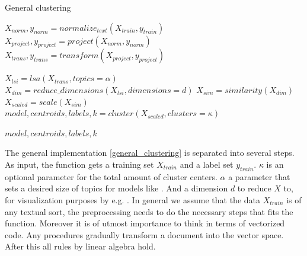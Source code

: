   \begin{algorithm}[H]
  \begin{algorithmic}[1]
    \caption{General clustering}\label{general_clustering}
      \State $X_{norm},y_{norm} = normalize_{text}(X_{train},y_{train})$
      \State $X_{project},y_{project} = project(X_{norm},y_{norm})$
      \State $X_{trans},y_{trans} = transform(X_{project},y_{project})$

      \State $X_{lsi} = lsa(X_{trans}, topics=\alpha)$
      \State $X_{dim} = reduce\_dimensions(X_{lsi}, dimensions=d)$
      \State $X_{sim} = similarity(X_{dim})$
      \State $X_{scaled} = scale(X_{sim})$
      \State $model,centroids,labels,k = cluster(X_{scaled}, clusters=\kappa)$

      \State \Return $model,centroids,labels,k$
    \EndFunction
  \end{algorithmic}
  \end{algorithm}

The general implementation \ref{general_clustering} is separated into several steps. As input, the function gets a training set $X_{train}$ and a label set $y_{train}$. $\kappa$ is an optional parameter for the total amount of cluster centers. $\alpha$ a parameter that sets a desired size of topics for models like \lsa{}. And a dimension $d$ to reduce $X$ to, for visualization purposes by e.g. \pca{}. In general we assume that the data $X_{train}$ is of any textual sort, the preprocessing needs to do the necessary steps that fits the function. Moreover it is of utmost importance to think in terms of vectorized code. Any procedures gradually transform a document into the vector space. After this all rules by linear algebra hold.

